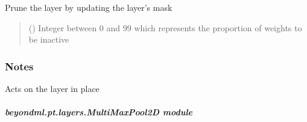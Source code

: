 \documentclass[letterpaper,10pt,english]{sphinxmanual}
\begin{document}
\begin{fulllineitems}
\begin{fulllineitems}
\label{\detokenize{beyondml.pt.layers:beyondml.pt.layers.MultiMaskedDense.MultiMaskedDense.prune}}
\pysigstartsignatures
{}
\pysigstopsignatures
\sphinxAtStartPar
Prune the layer by updating the layer’s mask
\begin{quote}\begin{description}
\sphinxAtStartPar
{} () \textendash{} Integer between 0 and 99 which represents the proportion of weights to be inactive

\end{description}\end{quote}
\subsubsection*{Notes}

\sphinxAtStartPar
Acts on the layer in place

\end{fulllineitems}


\end{fulllineitems}



\subparagraph{beyondml.pt.layers.MultiMaxPool2D module}
\label{\detokenize{beyondml.pt.layers:module-beyondml.pt.layers.MultiMaxPool2D}}\label{\detokenize{beyondml.pt.layers:beyondml-pt-layers-multimaxpool2d-module}}
\end{document}
